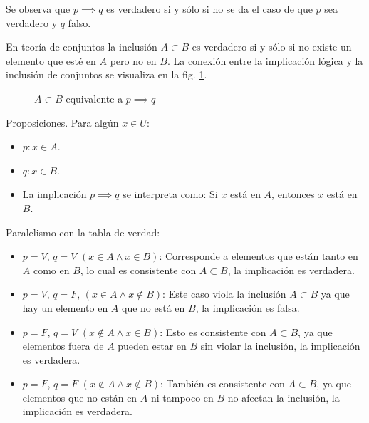 Se observa que $p \implies q$ es verdadero si y sólo si no se da el caso de que $p$ sea verdadero y $q$ falso.

En teoría de conjuntos la inclusión $A \subset B$ es verdadero si y sólo si no existe un elemento que esté en $A$ pero no en $B$. La conexión entre la implicación lógica y la inclusión de conjuntos se visualiza en la fig. \ref{fig:inclusion_logica}.

\begin{figure}[H]
	\centering
	\caption{$A \subset B$ equivalente a $p \implies q$}
	\label{fig:inclusion_logica}
\end{figure}

Proposiciones. Para algún $x \in U$:
\begin{itemize}
	\item $p: x \in A$.
	\item $q: x \in B$.
	\item La implicación $p \implies q$ se interpreta como: Si $x$ está en $A$, entonces $x$ está en $B$.
\end{itemize}

Paralelismo con la tabla de verdad:
\begin{itemize}
	\item $p = V$, $q = V$ $\left(x \in A \land x \in B \right)$: Corresponde a elementos que están tanto en $A$ como en $B$, lo cual es consistente con $A \subset B$, la implicación es verdadera.
	\item $p=V$, $q = F$, $(x \in A \land x \not \in B)$: Este caso viola la inclusión $A \subset B$ ya que hay un elemento en $A$ que no está en $B$, la implicación es falsa.
	\item $p = F$, $q = V$ $(x \not \in A \land x \in B)$: Esto es consistente con $A \subset B$, ya que elementos fuera de $A$ pueden estar en $B$ sin violar la inclusión, la implicación es verdadera.
	\item $p = F$, $q = F$ $\left( x \not \in A \land x \not \in B \right)$: También es consistente con $A \subset B$, ya que elementos que no están en $A$ ni tampoco en $B$ no afectan la inclusión, la implicación es verdadera.
\end{itemize}


